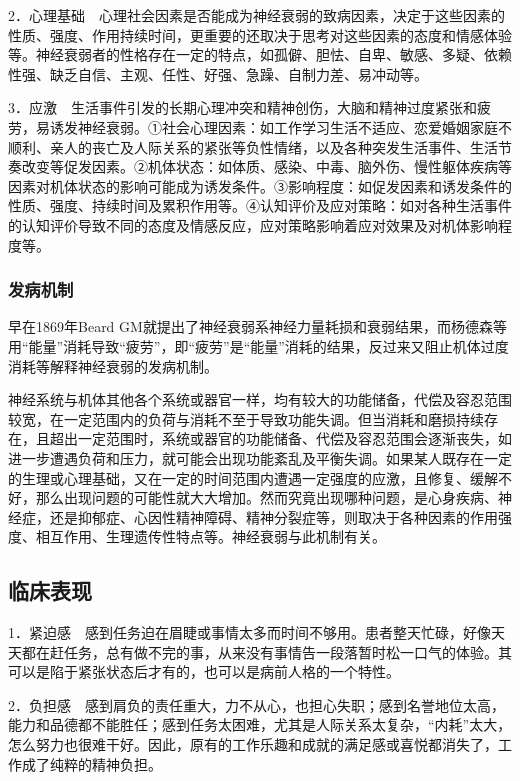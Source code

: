 2．心理基础　心理社会因素是否能成为神经衰弱的致病因素，决定于这些因素的性质、强度、作用持续时间，更重要的还取决于思考对这些因素的态度和情感体验等。神经衰弱者的性格存在一定的特点，如孤僻、胆怯、自卑、敏感、多疑、依赖性强、缺乏自信、主观、任性、好强、急躁、自制力差、易冲动等。

3．应激　生活事件引发的长期心理冲突和精神创伤，大脑和精神过度紧张和疲劳，易诱发神经衰弱。①社会心理因素：如工作学习生活不适应、恋爱婚姻家庭不顺利、亲人的丧亡及人际关系的紧张等负性情绪，以及各种突发生活事件、生活节奏改变等促发因素。②机体状态：如体质、感染、中毒、脑外伤、慢性躯体疾病等因素对机体状态的影响可能成为诱发条件。③影响程度：如促发因素和诱发条件的性质、强度、持续时间及累积作用等。④认知评价及应对策略：如对各种生活事件的认知评价导致不同的态度及情感反应，应对策略影响着应对效果及对机体影响程度等。

\subsubsection{发病机制}

早在1869年Beard
GM就提出了神经衰弱系神经力量耗损和衰弱结果，而杨德森等用“能量”消耗导致“疲劳”，即“疲劳”是“能量”消耗的结果，反过来又阻止机体过度消耗等解释神经衰弱的发病机制。

神经系统与机体其他各个系统或器官一样，均有较大的功能储备，代偿及容忍范围较宽，在一定范围内的负荷与消耗不至于导致功能失调。但当消耗和磨损持续存在，且超出一定范围时，系统或器官的功能储备、代偿及容忍范围会逐渐丧失，如进一步遭遇负荷和压力，就可能会出现功能紊乱及平衡失调。如果某人既存在一定的生理或心理基础，又在一定的时间范围内遭遇一定强度的应激，且修复、缓解不好，那么出现问题的可能性就大大增加。然而究竟出现哪种问题，是心身疾病、神经症，还是抑郁症、心因性精神障碍、精神分裂症等，则取决于各种因素的作用强度、相互作用、生理遗传性特点等。神经衰弱与此机制有关。

\subsection{临床表现}

1．紧迫感　感到任务迫在眉睫或事情太多而时间不够用。患者整天忙碌，好像天天都在赶任务，总有做不完的事，从来没有事情告一段落暂时松一口气的体验。其可以是陷于紧张状态后才有的，也可以是病前人格的一个特性。

2．负担感　感到肩负的责任重大，力不从心，也担心失职；感到名誉地位太高，能力和品德都不能胜任；感到任务太困难，尤其是人际关系太复杂，“内耗”太大，怎么努力也很难干好。因此，原有的工作乐趣和成就的满足感或喜悦都消失了，工作成了纯粹的精神负担。

